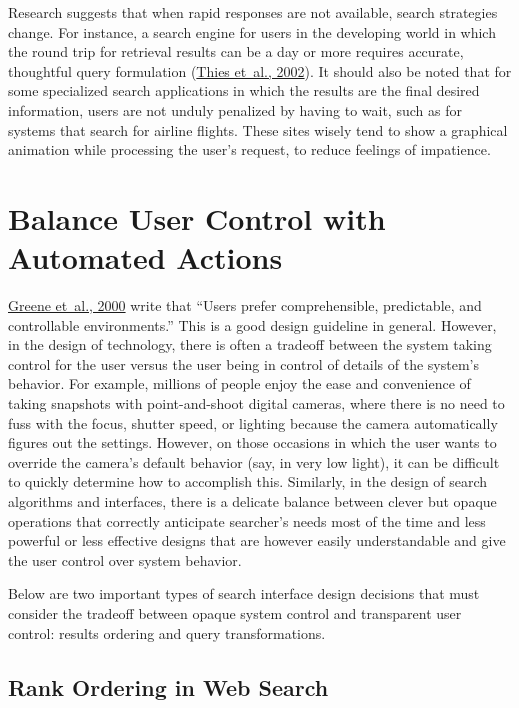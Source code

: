 \documentclass[sigconf,nonacm,screen,pbalance]{acmart}
\begin{document}
Research suggests that when rapid responses are not available, search strategies change. For instance, a
search engine for users in the developing world in which the round trip for retrieval results can be a
day or more requires accurate, thoughtful query formulation (\href{https://searchuserinterfaces.com/book/sui_references.html#thies2002sww}{Thies et~al., 2002}). It should also be noted that for some specialized search
applications in which the results are the final desired information, users are not unduly penalized by
having to wait, such as for systems that search for airline flights. These sites wisely tend to show a
graphical animation while processing the user's request, to reduce feelings of impatience.

\section{Balance User Control with Automated Actions}

\href{https://searchuserinterfaces.com/book/sui_references.html#greene2000pao}{Greene et~al., 2000} write that ``Users prefer comprehensible, predictable, and
controllable environments.'' This is a good design guideline in general. However, in the design of
technology, there is often a tradeoff between the system taking control for the user versus the user being
in control of details of the system's behavior. For example, millions of people enjoy the ease and
convenience of taking snapshots with point-and-shoot digital cameras, where there is no need to fuss with
the focus, shutter speed, or lighting because the camera automatically figures out the settings. However,
on those occasions in which the user wants to override the camera's default behavior (say, in very low
light), it can be difficult to quickly determine how to accomplish this. Similarly, in the design of
search algorithms and interfaces, there is a delicate balance between clever but opaque operations that
correctly anticipate searcher's needs most of the time and less powerful or less effective designs that
are however easily understandable and give the user control over system behavior.

Below are two important types of search interface design decisions that must consider the tradeoff between
opaque system control and transparent user control: results ordering and query transformations.

\subsection{Rank Ordering in Web Search}
\end{document}

